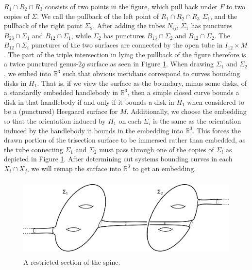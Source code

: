 \documentclass[12pt]{amsart}
\newcommand{\R}{\mathbb{R}}
\theoremstyle{definition}
\theoremstyle{remark}
\begin{document}
$R_1 \cap R_2 \cap R_3$ consists of two points in the figure, which pull back under $F$ to two copies of $\Sigma$.
We call the pullback of the left point of $R_1 \cap R_2 \cap R_3$ $\Sigma_1$, and the pullback of the right point $\Sigma_2$.
After adding the tubes $N_{ij}$, $\Sigma_1$ has punctures $B_{23} \cap \Sigma_1$ and $B_{12} \cap \Sigma_1$, while $\Sigma_2$ has punctures $B_{13} \cap \Sigma_2$ and $B_{12} \cap \Sigma_2$.
The $B_{12} \cap \Sigma_i$ punctures of the two surfaces are connected by the open tube in $I_{12} \times M$.
 The part of the triple intersection in lying the pullback of the figure therefore is a twice punctured genus-$2g$ surface as seen in Figure \ref{fig_coresubsurface}.
When drawing $\Sigma_1$ and $\Sigma_2$, we embed into $\R^3$ such that obvious meridians correspond to curves bounding disks in $H_1$.
That is, if we view the surface as the boundary, minus some disks, of a standardly embedded handlebody in $\R^3$, then a simple closed curve bounds a disk in that handlebody if and only if it bounds a disk in $H_1$ when considered to be a (punctured) Heegaard surface for $M$.
Additionally, we choose the embedding so that the orientation induced by $H_1$ on each $\Sigma_i$ is the same as the orientation induced by the handlebody it bounds in the embedding into $\R^3$.
This forces the drawn portion of the trisection surface to be immersed rather than embedded, as the tube connecting $\Sigma_1$ and $\Sigma_2$ must pass through one of the copies of $\Sigma_i$ as depicted in Figure \ref{fig_coresubsurface}.
After determining cut systems bounding curves in each $X_i \cap X_j$, we will remap the surface into $\R^3$ to get an embedding.

\begin{figure}[h]
\centering
\includegraphics[height=1.6in]{coresubsurface.png}
\caption{A restricted section of the spine.}
\label{fig_coresubsurface}
\end{figure}
\end{document}
